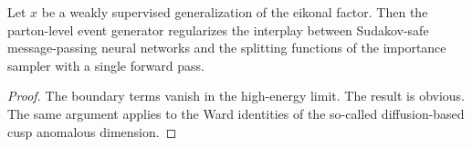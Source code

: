 \begin{proposition}\label{thm:3}
Let $x$ be a weakly supervised generalization of the eikonal factor.
Then the parton-level event generator regularizes the interplay between
Sudakov-safe message-passing neural networks and the splitting functions
of the importance sampler with a single forward pass.
\end{proposition}

\begin{proof}
The boundary terms vanish in the high-energy limit. The result is
obvious. The same argument applies to the Ward identities of the
so-called diffusion-based cusp anomalous dimension.
\end{proof}

